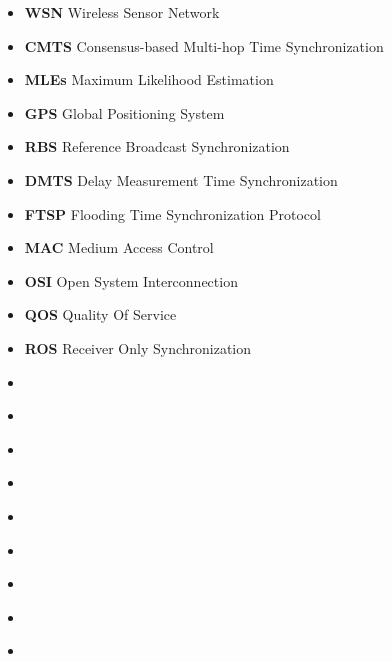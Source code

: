 \begin{itemize}
	\item \textbf{WSN} Wireless Sensor Network
	\item \textbf{CMTS} Consensus-based Multi-hop Time Synchronization
	\item \textbf{MLEs} Maximum Likelihood Estimation
	\item \textbf{GPS} Global Positioning System 
	\item \textbf{RBS} Reference Broadcast Synchronization
	\item \textbf{DMTS}  Delay Measurement Time Synchronization
	\item \textbf{FTSP}  Flooding Time Synchronization Protocol
	\item \textbf{MAC}  Medium Access Control 
	\item \textbf{OSI}  Open System Interconnection
	\item \textbf{QOS} Quality Of Service
	\item \textbf{ROS} Receiver Only Synchronization 
	\item \textbf{} 
	\item \textbf{} 
	\item \textbf{} 
	\item \textbf{} 
	\item \textbf{} 
	\item \textbf{} 
	\item \textbf{} 
	\item \textbf{} 
	\item \textbf{} 

\end{itemize}
	
